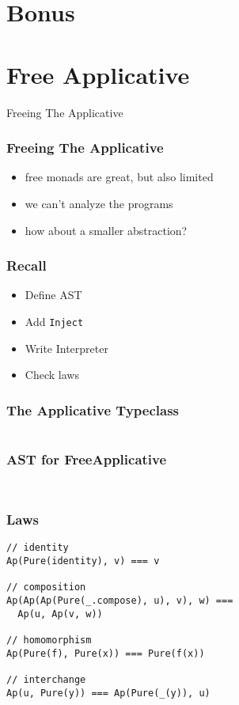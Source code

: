\documentclass{beamer}
\newcommand{\recipe}{%
  \begin{itemize}
  \item Define AST
  \item Add \texttt{Inject}
  \item Write Interpreter
  \item Check laws
  \end{itemize}
}
\begin{document}
\begin{frame}
  \tableofcontents{}
\end{frame}

\appendix{}

\section*{Bonus}\label{sec:bonus}

\section{Free Applicative}\label{sec:free-applicative}
\begin{frame}
  \begin{center}
    \Huge
    Freeing The Applicative
  \end{center}
\end{frame}

\begin{frame}
  \frametitle{Freeing The Applicative}
  \begin{itemize}
  \item free monads are great, but also limited
  \item we can't analyze the programs
  \item how about a smaller abstraction?
  \end{itemize}
\end{frame}

\begin{frame}
  \frametitle{Recall}
  \recipe{}
\end{frame}

\begin{frame}[fragile]
  \frametitle{The Applicative Typeclass}
  \inputminted{scala}{snippets/applicative-typeclass.scala}
\end{frame}

\begin{frame}[fragile]
  \frametitle{AST for FreeApplicative}
    \inputminted{scala}{snippets/free-applicative.scala}
  \begin{verbatim}
\end{verbatim}
\end{frame}

\begin{frame}[fragile]
  \frametitle{Laws}
\begin{verbatim}
// identity
Ap(Pure(identity), v) === v

// composition
Ap(Ap(Ap(Pure(_.compose), u), v), w) ===
  Ap(u, Ap(v, w))

// homomorphism
Ap(Pure(f), Pure(x)) === Pure(f(x))

// interchange
Ap(u, Pure(y)) === Ap(Pure(_(y)), u)
\end{verbatim}
\end{frame}
\end{document}
